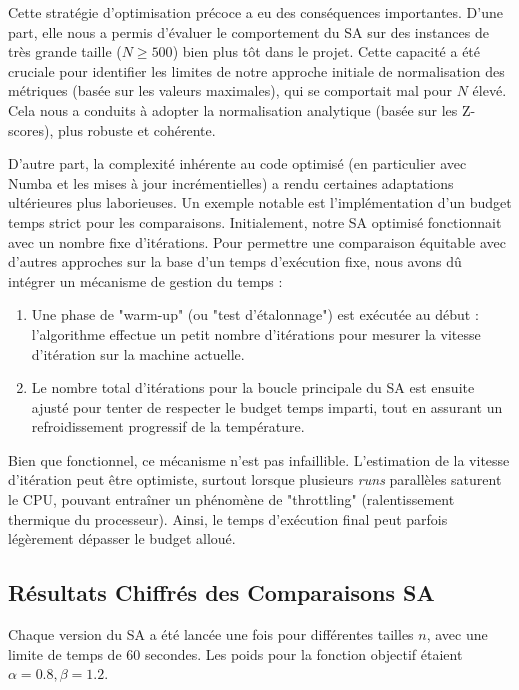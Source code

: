\documentclass[11pt, a4paper]{article}
\begin{document}
Cette stratégie d'optimisation précoce a eu des conséquences importantes. D'une part, elle nous a permis d'évaluer le comportement du SA sur des instances de très grande taille ($N \ge 500$) bien plus tôt dans le projet. Cette capacité a été cruciale pour identifier les limites de notre approche initiale de normalisation des métriques (basée sur les valeurs maximales), qui se comportait mal pour $N$ élevé. Cela nous a conduits à adopter la normalisation analytique (basée sur les Z-scores), plus robuste et cohérente.

D'autre part, la complexité inhérente au code optimisé (en particulier avec Numba et les mises à jour incrémentielles) a rendu certaines adaptations ultérieures plus laborieuses. Un exemple notable est l'implémentation d'un budget temps strict pour les comparaisons. Initialement, notre SA optimisé fonctionnait avec un nombre fixe d'itérations. Pour permettre une comparaison équitable avec d'autres approches sur la base d'un temps d'exécution fixe, nous avons dû intégrer un mécanisme de gestion du temps :
\begin{enumerate}
    \item Une phase de "warm-up" (ou "test d'étalonnage") est exécutée au début : l'algorithme effectue un petit nombre d'itérations pour mesurer la vitesse d'itération sur la machine actuelle.
    \item Le nombre total d'itérations pour la boucle principale du SA est ensuite ajusté pour tenter de respecter le budget temps imparti, tout en assurant un refroidissement progressif de la température.
\end{enumerate}
Bien que fonctionnel, ce mécanisme n'est pas infaillible. L'estimation de la vitesse d'itération peut être optimiste, surtout lorsque plusieurs \textit{runs} parallèles saturent le CPU, pouvant entraîner un phénomène de "throttling" (ralentissement thermique du processeur). Ainsi, le temps d'exécution final peut parfois légèrement dépasser le budget alloué.


\subsection{Résultats Chiffrés des Comparaisons SA} %
Chaque version du SA a été lancée une fois pour différentes tailles $n$, avec une limite de temps de 60 secondes. Les poids pour la fonction objectif étaient $\alpha=0.8, \beta=1.2$.
\end{document}
